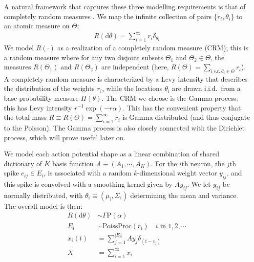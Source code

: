 \documentclass{article} %
\newcommand{\dd}{\mathrm{d}}
\begin{document}
A natural framework that captures these three modelling requirements is that of completely random measures \citep{Kingman:PJM67}.
We map the infinite collection of pairs $\{r_i, \theta_i\}$ to an atomic measure on $\Theta$:
\begin{align}
  R(\dd \theta) = \sum_{i=1}^{\infty} r_i \delta_{\theta_i}
\end{align}
 We model $R(\cdot)$ as a realization of a completely random measure (CRM); this is a random measure where for any two disjoint subsets $\varTheta_1$ and 
$\varTheta_2 \in \Theta$, the measures $R(\Theta_1)$ and $R(\Theta_2)$ are independent (here, $R(\varTheta) = \sum_{i\ s.t.\ \theta_i \in \Theta} r_i$). 
A completely random measure is characterized by a Levy intensity that
describes the distribution of the weights $r_i$, while the locations $\theta_i$ are drawn i.i.d.\  from a base probability measure $H(\theta)$.
The CRM we choose is the Gamma process; this has Levy intensity $r^{-1}\exp(-r\alpha)$. This has the convenient property that the 
total mass $R \equiv R(\Theta) = \sum_{i=1}^{\infty} r_i$ is Gamma distributed (and thus conjugate to the Poisson). 
The Gamma process is also closely connected with the Dirichlet process, which will prove useful
later on.

 We model each action potential shape as a linear combination of shared dictionary of $K$ basis function $A \equiv (A_1, \cdots, A_K)$. 
For the $i$th neuron, the $j$th spike $e_{ij} \in E_i$, is associated with a random $k$-dimensional weight vector $y_{ij}$, and this spike is convolved with a 
smoothing kernel given by $A y_{ij}$.
We let $y_{ij}$ be normally distributed, with $\theta_i \equiv (\mu_i, \Sigma_i)$ determining the mean and variance.
The overall model is then:
\begin{align}
  R(\dd \theta) & \sim \Gamma \text{P}(\alpha) \\
  E_i\ \  &\sim \text{PoissProc}(r_i) \quad i \text{ in } 1,2,\cdots \\
  x_i(t) &= \sum_{j = 1}^{|E_i|} Ay_j \delta_{(t - e_j)} \\
  X   &= \sum_{i=1}^{\infty} x_i
\end{align}

\end{document}
